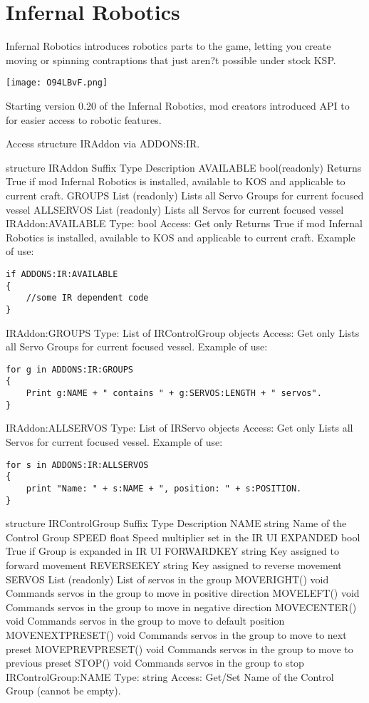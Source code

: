 	\section{Infernal Robotics}%
	Infernal Robotics introduces robotics parts to the game, letting you create moving or spinning contraptions that just aren?t possible under stock KSP.
	
\begin{center}
\texttt{[image: O94LBvF.png]}
\end{center}

Starting version 0.20 of the Infernal Robotics, mod creators introduced API to for easier access to robotic features.

Access structure IRAddon via ADDONS:IR.

structure IRAddon
Suffix	Type	Description
AVAILABLE	bool(readonly)	Returns True if mod Infernal Robotics is installed, available to KOS and applicable to current craft.
GROUPS	List (readonly)	Lists all Servo Groups for current focused vessel
ALLSERVOS	List (readonly)	Lists all Servos for current focused vessel
IRAddon:AVAILABLE
Type:	bool
Access:	Get only
Returns True if mod Infernal Robotics is installed, available to KOS and applicable to current craft. Example of use:

\begin{Verbatim}[frame=single]
if ADDONS:IR:AVAILABLE
{
    //some IR dependent code
}
\end{Verbatim}

IRAddon:GROUPS
Type:	List of IRControlGroup objects
Access:	Get only
Lists all Servo Groups for current focused vessel. Example of use:

\begin{Verbatim}[frame=single]
for g in ADDONS:IR:GROUPS
{
    Print g:NAME + " contains " + g:SERVOS:LENGTH + " servos".
}
\end{Verbatim}

IRAddon:ALLSERVOS
Type:	List of IRServo objects
Access:	Get only
Lists all Servos for current focused vessel. Example of use:

\begin{Verbatim}[frame=single]
for s in ADDONS:IR:ALLSERVOS
{
    print "Name: " + s:NAME + ", position: " + s:POSITION.
}
\end{Verbatim}

structure IRControlGroup
Suffix	Type	Description
NAME	string	Name of the Control Group
SPEED	float	Speed multiplier set in the IR UI
EXPANDED	bool	True if Group is expanded in IR UI
FORWARDKEY	string	Key assigned to forward movement
REVERSEKEY	string	Key assigned to reverse movement
SERVOS	List (readonly)	List of servos in the group
MOVERIGHT()	void	Commands servos in the group to move in positive direction
MOVELEFT()	void	Commands servos in the group to move in negative direction
MOVECENTER()	void	Commands servos in the group to move to default position
MOVENEXTPRESET()	void	Commands servos in the group to move to next preset
MOVEPREVPRESET()	void	Commands servos in the group to move to previous preset
STOP()	void	Commands servos in the group to stop
IRControlGroup:NAME
Type:	string
Access:	Get/Set
Name of the Control Group (cannot be empty).

